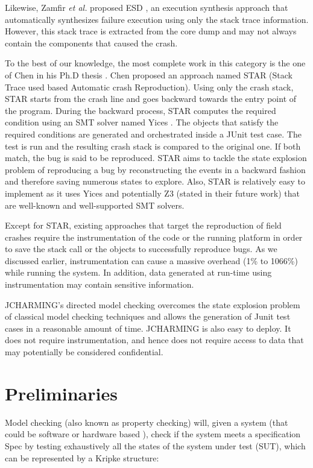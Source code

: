 \documentclass[times]{smrauth}
\begin{document}
Likewise, Zamfir {\it et al.} proposed ESD \cite{Zamfir2010}, an execution synthesis approach that automatically synthesizes failure execution using only the stack trace information. However, this stack trace is extracted from the core dump and may not always contain the components that caused the crash.

To the best of our knowledge, the most complete work in this category is the one of Chen in his Ph.D thesis \cite{Chen2013a}. Chen proposed an approach named STAR (Stack Trace used based Automatic crash Reproduction). Using only the crash stack, STAR starts from the crash line and goes backward towards the entry point of the program. During the backward process, STAR computes the required condition using an SMT solver named Yices \cite{Dutertre2006}. The objects that satisfy the required conditions are generated and orchestrated inside a JUnit test case. The test is run and the resulting crash stack is compared to the original one. If both match, the bug is said to be reproduced. STAR aims to tackle the state explosion problem of reproducing a bug by reconstructing the events in a backward fashion and therefore saving numerous states to explore. Also, STAR is relatively easy to implement as it uses Yices \cite{Dutertre2006} and potentially Z3 \cite{de2008z3} (stated in their future work) that are well-known and well-supported SMT solvers. 

Except for STAR, existing approaches that target the reproduction of field crashes require the instrumentation of the code or the running platform in order to save the stack call or the objects to successfully reproduce bugs. As we discussed earlier, instrumentation can cause a massive overhead (1\% to 1066\%) while running the system. In addition, data generated at run-time using instrumentation may contain sensitive information.

JCHARMING's directed model checking overcomes the state explosion problem of classical model checking techniques and allows the generation of Junit test cases in a reasonable amount of time. JCHARMING is also easy to deploy. It does not require instrumentation, and hence does not require access to data that may potentially be considered confidential. 


\section{Preliminaries\label{sec:prelimenaries}}

Model checking (also known as property checking) will, given a system (that could be software \cite{Visser2003} or hardware based \cite{kropf1999introduction}), check if the system meets a specification Spec by testing exhaustively all the states of the system under test (SUT), which can be represented by a Kripke \cite{Kripke1963} structure:
\end{document}
